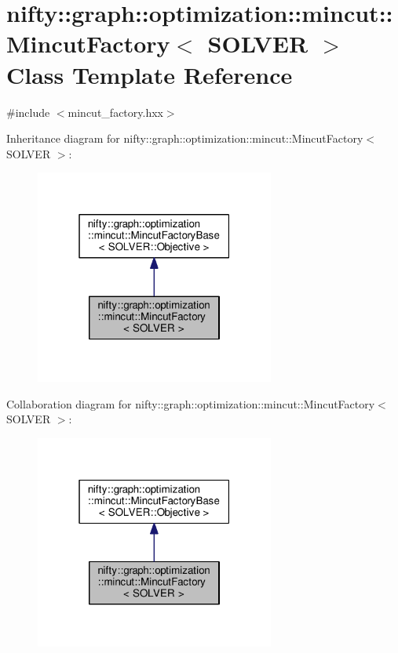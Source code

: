 \hypertarget{classnifty_1_1graph_1_1optimization_1_1mincut_1_1MincutFactory}{}\section{nifty\+:\+:graph\+:\+:optimization\+:\+:mincut\+:\+:Mincut\+Factory$<$ S\+O\+L\+V\+E\+R $>$ Class Template Reference}
\label{classnifty_1_1graph_1_1optimization_1_1mincut_1_1MincutFactory}


{\ttfamily \#include $<$mincut\+\_\+factory.\+hxx$>$}



Inheritance diagram for nifty\+:\+:graph\+:\+:optimization\+:\+:mincut\+:\+:Mincut\+Factory$<$ S\+O\+L\+V\+E\+R $>$\+:\nopagebreak
\begin{figure}[H]
\begin{center}
\leavevmode
\includegraphics[width=223pt]{classnifty_1_1graph_1_1optimization_1_1mincut_1_1MincutFactory__inherit__graph}
\end{center}
\end{figure}


Collaboration diagram for nifty\+:\+:graph\+:\+:optimization\+:\+:mincut\+:\+:Mincut\+Factory$<$ S\+O\+L\+V\+E\+R $>$\+:\nopagebreak
\begin{figure}[H]
\begin{center}
\leavevmode
\includegraphics[width=223pt]{classnifty_1_1graph_1_1optimization_1_1mincut_1_1MincutFactory__coll__graph}
\end{center}
\end{figure}

